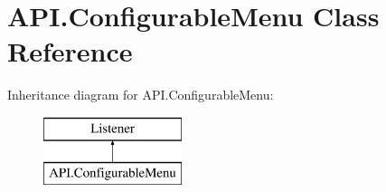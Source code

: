 \hypertarget{class_a_p_i_1_1_configurable_menu}{}\section{A\+P\+I.\+Configurable\+Menu Class Reference}
\label{class_a_p_i_1_1_configurable_menu}
Inheritance diagram for A\+P\+I.\+Configurable\+Menu\+:\begin{figure}[H]
\begin{center}
\leavevmode
\includegraphics[height=2.000000cm]{class_a_p_i_1_1_configurable_menu}
\end{center}
\end{figure}
